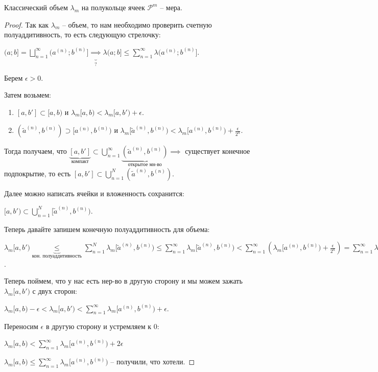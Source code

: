 
\begin{theorem}
    Классический объем $\lambda_m$ на полукольце ячеек $\mathcal{P}^m$ -- мера.
\end{theorem}

\begin{proof}
    Так как $\lambda_m$ -- объем, то нам необходимо проверить счетную полуаддитивность, то есть следующую стрелочку:

    $(a; b] = \bigsqcup_{n=1}^{\infty} (a^{(n)}; b^{(n)}] \underbrace{\implies}_{?} \lambda (a; b] \leq \sum_{n=1}^{\infty} \lambda (a^{(n)}; b^{(n)}]$.

    Берем $\epsilon > 0$.

    Затем возьмем:
    
    \begin{enumerate}
        \item {
            $[a, b'] \subset [a, b)$ и  $\lambda_m [a, b) < \lambda_m [a, b') + \epsilon$.
        }
        \item {
            $(\tilde{a}^{(n)}, b^{(n)}) \supset [a^{(n)}, b^{(n)})$ и $\lambda_m [\tilde{a}^{(n)}, b^{(n)}) < \lambda_m [a^{(n)}, b^{(n)}) + \frac{\epsilon}{2^n}$.
        }
    \end{enumerate}

    Тогда получаем, что $\underbrace{[a, b']}_{\text{компакт}} \subset \bigcup_{n=1}^{\infty} \underbrace{(\tilde{a}^{(n)}, b^{(n)})}_{\text{открытое мн-во}} \implies $ существует конечное подпокрытие, то есть $[a, b'] \subset \bigcup_{n=1}^{N} (\tilde{a}^{(n)}, b^{(n)})$.


    Далее можно написать ячейки и вложенность сохранится:

    $[a, b') \subset \bigcup_{n=1}^{N} [\tilde{a}^{(n)}, b^{(n)})$.

    Теперь давайте запишем конечную полуаддитивность для объема:

    $\lambda_m [a, b') \underbrace{\leq}_{\text{кон. полуаддитивность}} \sum_{n=1}^{N} \lambda_m [\tilde{a}^{(n)}, b^{(n)}) \leq \sum_{n=1}^{\infty} \lambda_m [\tilde{a}^{(n)}, b^{(n)}) < \sum_{n=1}^{\infty} \left(\lambda_m [a^{(n)}, b^{(n)}) + \frac{\epsilon}{2^n}\right) = \sum_{n=1}^{\infty} \lambda_m [a^{(n)}, b^{(n)}) + \epsilon$.

    Теперь поймем, что у нас есть нер-во в другую сторону и мы можем зажать $\lambda_m [a, b')$ с двух сторон:

    $\lambda_m [a, b) - \epsilon < \lambda_m [a, b') < \sum_{n=1}^{\infty} \lambda_m [a^{(n)}, b^{(n)}) + \epsilon$.

    Переносим $\epsilon$ в другую сторону и устремляем к $0$:

    $\lambda_m [a, b) < \sum_{n=1}^{\infty} \lambda_m [a^{(n)}, b^{(n)}) + 2 \epsilon$

    $\lambda_m [a, b) \leq \sum_{n=1}^{\infty} \lambda_m [a^{(n)}, b^{(n)})$ -- получили, что хотели.
\end{proof}

